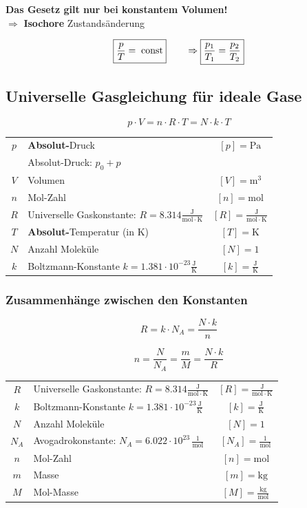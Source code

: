 \textbf{Das Gesetz gilt nur bei konstantem Volumen!} \\
$\Rightarrow$ \textbf{Isochore} Zustandsänderung

$$ \boxed{ \frac{p}{T} = \; \mathrm{const} } \qquad  \Rightarrow \boxed{ \frac{p_1}{T_1} = \frac{p_2}{T_2} }$$


	
\subsection{Universelle Gasgleichung für ideale Gase}

$$ \boxed{ p \cdot V = n \cdot R \cdot T = N \cdot k \cdot T }$$
	
	
\begin{tabular}{c l c}
	$p$ & \textbf{Absolut-}Druck & $[p] = \mathrm{Pa}$ \\
	    & Absolut-Druck: $p_0 + p$ & \\
	$V$ & Volumen & $[V] = \mathrm{m^3}$ \\
	$n$ & Mol-Zahl & $[n] = \mathrm{mol}$ \\
	\rule{0pt}{8pt}$R$ & Universelle Gaskonstante: $R = 8.314 \mathrm{\frac{J}{mol \cdot K}}$ & $[R] = \mathrm{\frac{J}{mol \cdot K}} $ \\
	$T$ & \textbf{Absolut-}Temperatur (in K) & $[T] = \mathrm{K}$ \\
	$N$ & Anzahl Moleküle & $[N] = 1$ \\
	\rule{0pt}{8pt}$k$ & Boltzmann-Konstante $k = 1.381 \cdot 10^{-23} \mathrm{\frac{J}{K}}$ & $[k] = \mathrm{\frac{J}{K}}$ \\
\end{tabular}
	
	
	
	
\subsubsection{Zusammenhänge zwischen den Konstanten}
	
$$  \boxed{ R = k \cdot N_A = \frac{N \cdot k}{n} } $$

$$\boxed{ n = \frac{N}{N_A} = \frac{m}{M} = \frac{N \cdot k}{R} } $$
	


\begin{tabular}{c l c}
	\rule{0pt}{8pt}$R$ & Universelle Gaskonstante: $R = 8.314 \mathrm{\frac{J}{mol \cdot K}}$ & $[R] = \mathrm{\frac{J}{mol \cdot K}} $ \\
	\rule{0pt}{8pt}$k$ & Boltzmann-Konstante $k = 1.381 \cdot 10^{-23} \mathrm{\frac{J}{K}}$ & $[k] = \mathrm{\frac{J}{K}}$ \\
	$N$ & Anzahl Moleküle & $[N] = 1$ \\
	\rule{0pt}{8pt}$N_A$ & 	Avogadrokonstante: $N_A = 6.022 \cdot 10^{23} \, \mathrm{\frac{1}{mol}} $ & $[N_A] =  \mathrm{\frac{1}{mol}}$  \\	
	$n$ & Mol-Zahl & $[n] = \mathrm{mol}$ \\
	$m$ & Masse & $[m] = \mathrm{kg}$ \\
	\rule{0pt}{8pt}$M$ & Mol-Masse & $[M] = \mathrm{\frac{kg}{mol}}$ \\
\end{tabular}

